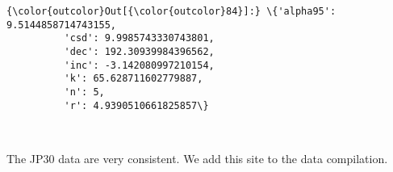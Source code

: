 \documentclass{article}
\begin{document}
            \begin{Verbatim}[commandchars=\\\{\}]
{\color{outcolor}Out[{\color{outcolor}84}]:} \{'alpha95': 9.5144858714743155,
          'csd': 9.9985743330743801,
          'dec': 192.30939984396562,
          'inc': -3.142080997210154,
          'k': 65.628711602779887,
          'n': 5,
          'r': 4.9390510661825857\}
\end{Verbatim}
        
    \begin{center}
    \end{center}
    { \hspace*{\fill} \\}
    
    The JP30 data are very consistent. We add this site to the data
compilation.
\end{document}
